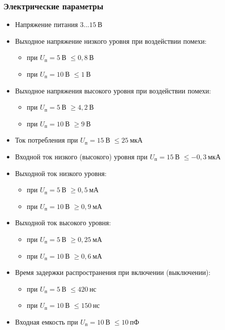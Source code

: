 \subsubsection*{Электрические параметры}
\begin{itemize}
    \item[] Напряжение питания \dotfill $3...15~\text{В}$
    \item[] Выходное напряжение низкого уровня при воздействии помехи:
    \begin{itemize}
	    \item[] при $U_{\text{п}}=5~\text{В}$ \dotfill $\leq 0,8~\text{В}$
	    \item[] при $U_{\text{п}}=10~\text{В}$ \dotfill $\leq 1~\text{В}$
    \end{itemize}
    \item[] Выходное напряжения высокого уровня при воздействии помехи: 
    \begin{itemize}
	    \item[] при $U_{\text{п}}=5~\text{В}$ \dotfill $\geq 4,2~\text{В}$ 
	    \item[] при $U_{\text{п}}=10~\text{В}$ \dotfill $\geq 9~\text{В}$
    \end{itemize}
    \item[] Ток потребления при $U_{\text{п}}=15~\text{В}$ \dotfill $\leq 25~\text{мкА}$
    \item[] Входной ток низкого (высокого) уровня при $U_{\text{п}}=15~\text{В}$  \dotfill $\leq -0,3~\text{мкА}$
    \item[] Выходной ток низкого уровня: 
    \begin{itemize}
	    \item[] при $U_{\text{п}}=5~\text{В}$ \dotfill $\geq 0,5~\text{мА}$ 
	    \item[] при $U_{\text{п}}=10~\text{В}$ \dotfill $\geq 0,9~\text{мА}$
    \end{itemize}
    \item[] Выходной ток высокого уровня: 
    \begin{itemize}
	    \item[] при $U_{\text{п}}=5~\text{В}$ \dotfill $\geq 0,25~\text{мА}$ 
	    \item[] при $U_{\text{п}}=10~\text{В}$ \dotfill $\geq 0,6~\text{мА}$
    \end{itemize}
    \item[] Время задержки распространения при включении (выключении): 
    \begin{itemize}
	    \item[] при $U_{\text{п}}=5~\text{В}$ \dotfill $\leq 420~\text{нс}$ 
	    \item[] при $U_{\text{п}}=10~\text{В}$ \dotfill $\leq 150~\text{нс}$
    \end{itemize}
    \item[] Входная емкость при $U_{\text{п}}=10~\text{В}$ \dotfill $\leq 10~\text{пФ}$
\end{itemize}


